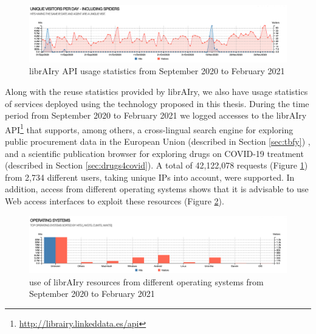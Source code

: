 \begin{figure}[ht]
    \centering
    \includegraphics[width=\linewidth]{usage-statistics.png}
    \caption{librAIry API usage statistics from September 2020 to February 2021}
    \label{fig:api-usage}
\end{figure}


Along with the reuse statistics provided by librAIry, we also have usage statistics of services deployed using the technology proposed in this thesis. During the time period from September 2020 to February 2021 we logged accesses to the librAIry API\footnote{\url{http://librairy.linkeddata.es/api}} that supports, among others, a cross-lingual search engine for exploring public procurement data in the European Union (described in Section \ref{sec:tbfy}) , and a scientific publication browser for exploring drugs on COVID-19 treatment  (described in Section \ref{sec:drugs4covid}).  A total of 42,122,078 requests (Figure \ref{fig:api-usage}) from 2,734 different users, taking unique IPs into account, were supported. In addition, access from different operating systems shows that it is advisable to use Web access interfaces to exploit these resources (Figure \ref{fig:so-usage}).


\begin{figure}[ht]
    \centering
    \includegraphics[width=\linewidth]{so-statistics.png}
    \caption{use of librAIry resources from different operating systems from September 2020 to February 2021}
    \label{fig:so-usage}
\end{figure}


